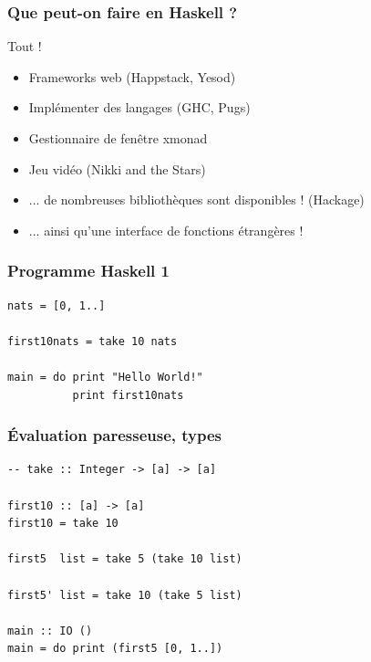 \documentclass[10pt]{beamer}
\begin{document}
\begin{frame}
\frametitle{Que peut-on faire en Haskell ?}

\pause

Tout !

\pause

\begin{itemize}

\item Frameworks web (Happstack, Yesod)
\pause

\item Implémenter des langages (GHC, Pugs)
\pause

\item Gestionnaire de fenêtre xmonad
\pause

\item Jeu vidéo (Nikki and the Stars)
\pause

\item ... de nombreuses bibliothèques sont disponibles ! (Hackage)
\pause

\item ... ainsi qu'une interface de fonctions étrangères !

\end{itemize}

\end{frame}



\begin{frame}[fragile]
\frametitle{Programme Haskell 1}

\begin{verbatim}
nats = [0, 1..]

first10nats = take 10 nats

main = do print "Hello World!"
          print first10nats
\end{verbatim}

\end{frame}



\begin{frame}[fragile]
\frametitle{Évaluation paresseuse, types}

\begin{verbatim}
-- take :: Integer -> [a] -> [a]

first10 :: [a] -> [a]
first10 = take 10

first5  list = take 5 (take 10 list)

first5' list = take 10 (take 5 list)

main :: IO ()
main = do print (first5 [0, 1..])
\end{verbatim}

\end{frame}
\end{document}

